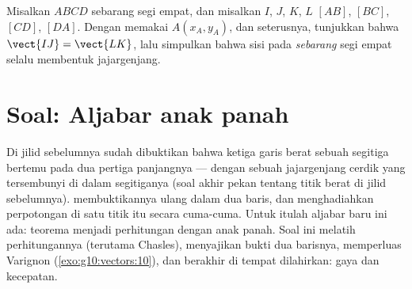 \begin{exercise}[$\star\star\star$]\label{exo:g10:vectors:10}
Misalkan $ABCD$ sebarang segi empat, dan misalkan $I$, $J$, $K$, $L$  $[AB]$, $[BC]$, $[CD]$, $[DA]$. Dengan memakai 
$A(x_A, y_A)$, dan seterusnya, tunjukkan bahwa $\vect{IJ} = \vect{LK}$, lalu
simpulkan bahwa  sisi pada \emph{sebarang} segi empat selalu
membentuk jajargenjang.
\end{exercise}

\section{Soal: Aljabar anak panah}

\begin{problem}
\label{pb:g10:vectors:1}
Di jilid sebelumnya sudah dibuktikan bahwa ketiga garis berat sebuah
segitiga bertemu pada dua pertiga panjangnya --- dengan sebuah jajargenjang
cerdik yang tersembunyi di dalam segitiganya (soal akhir pekan tentang titik
berat di jilid sebelumnya).  membuktikannya ulang dalam
dua baris, dan menghadiahkan perpotongan di satu titik itu secara
cuma-cuma. Untuk itulah aljabar baru ini ada: teorema menjadi perhitungan dengan
anak panah. Soal ini melatih perhitungannya (terutama Chasles),
menyajikan bukti dua barisnya, memperluas Varignon
(\cref{exo:g10:vectors:10}), dan berakhir di tempat  dilahirkan:
gaya dan kecepatan.


\end{problem}
